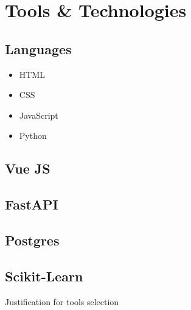 \section{Tools \& Technologies}
\subsection{Languages}
\begin{itemize}
  \item HTML
  \item CSS 
  \item JavaScript 
  \item Python

\end{itemize}
\subsection{Vue JS}
\subsection{FastAPI}
\subsection{Postgres}
\subsection{Scikit-Learn}

{\large\color{red}Justification for tools selection}


